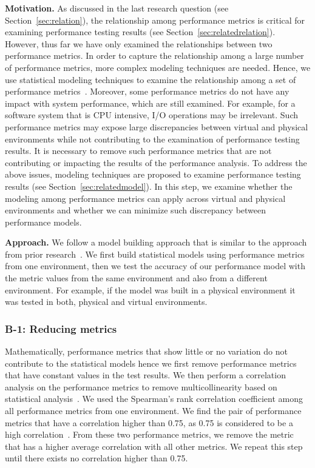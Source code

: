 \documentclass[smallextended]{svjour3}       %
\begin{document}
\noindent \textbf{Motivation.}
As discussed in the last research question (see Section~\ref{sec:relation}), the relationship among performance metrics is critical for examining performance testing results (see Section~\ref{sec:relatedrelation}). However, thus far we have only examined the relationships between two performance metrics. In order to capture the relationship among a large number of performance metrics, more complex modeling techniques are needed. Hence, we use statistical modeling techniques to examine the relationship among a set of performance metrics~\cite{xiong2013vperfguard,cohen2004correlating}. Moreover, some performance metrics do not have any impact with system performance, which are still examined. For example, for a software system that is CPU intensive, I/O operations may be irrelevant. Such performance metrics may expose large discrepancies between virtual and physical environments while not contributing to the examination of performance testing results. It is necessary to remove such performance metrics that are not contributing or impacting the results of the performance analysis. To address the above issues, modeling techniques are proposed to examine performance testing results (see Section~\ref{sec:relatedmodel}). In this step, we examine whether the modeling among performance metrics can apply across virtual and physical environments and whether we can minimize such discrepancy between performance models.


\noindent \textbf{Approach.}
We follow a model building approach that is similar to the approach from prior research~\cite{Shang:2015:ADP:2668930.2688052,Cohen:2005:CIC:1095810.1095821,xiong2013vperfguard}. We first build statistical models using performance metrics from one environment, then we test the accuracy of our performance model with the metric values from the same environment and also from a different environment. For example, if the model was built in a physical environment it was tested in both, physical and virtual environments.

\subsubsection{B-1: Reducing metrics}

Mathematically, performance metrics that show little or no variation do not contribute to the statistical models hence we first remove performance metrics that have constant values in the test results. We then perform a correlation analysis on the performance metrics to remove multicollinearity based on statistical analysis~\cite{cor_R}. We used the Spearman's rank correlation coefficient among all performance metrics from one environment. We find the pair of performance metrics that have a correlation higher than 0.75, as 0.75 is considered to be a high correlation~\cite{Syer2016}. From these two performance metrics, we remove the metric that has a higher average correlation with all other metrics. We repeat this step until there exists no correlation higher than 0.75.
\end{document}
